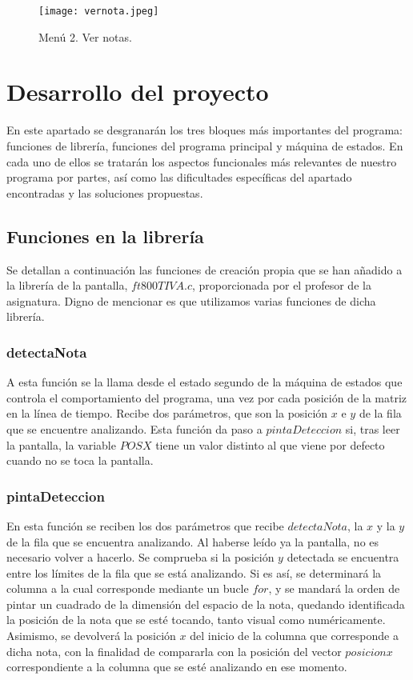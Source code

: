 \documentclass[12pt,a4paper]{article}
\begin{document}
\begin{figure}[h!]
\centering
  \texttt{[image: vernota.jpeg]}
  \caption{Menú 2. Ver notas.}
  \label{fig:img1}
\end{figure}

\section{Desarrollo del proyecto}
En este apartado se desgranarán los tres bloques más importantes del programa: funciones de librería, funciones del programa principal y máquina de estados. En cada uno de ellos se tratarán los aspectos funcionales más relevantes de nuestro programa por partes, así como las dificultades específicas del apartado encontradas y las soluciones propuestas.

\subsection{Funciones en la librería}
Se detallan a continuación las funciones de creación propia que se han añadido a la librería de la pantalla, $ft800TIVA.c$, proporcionada por el profesor de la asignatura. Digno de mencionar es que utilizamos varias funciones de dicha librería.

\subsubsection{detectaNota}
A esta función se la llama desde el estado segundo de la máquina de estados que controla el comportamiento del programa, una vez por cada posición de la matriz en la línea de tiempo. Recibe dos parámetros, que son la posición $x$ e $y$ de la fila que se encuentre analizando.
Esta función da paso a $pintaDeteccion$ si, tras leer la pantalla, la variable $POSX$ tiene un valor distinto al que viene por defecto cuando no se toca la pantalla.

\subsubsection{pintaDeteccion}
En esta función se reciben los dos parámetros que recibe $detectaNota$, la $x$ y la $y$ de la fila que se encuentra analizando. Al haberse leído ya la pantalla, no es necesario volver a hacerlo. 
Se comprueba si la posición $y$ detectada se encuentra entre los límites de la fila que se está analizando. Si es así, se determinará la columna a la cual corresponde mediante un bucle $for$, y se mandará la orden de pintar un cuadrado de la dimensión del espacio de la nota, quedando identificada la posición de la nota que se esté tocando, tanto visual como numéricamente. Asimismo, se devolverá la posición $x$ del inicio de la columna que corresponde a dicha nota, con la finalidad de compararla con la posición del vector $posicionx$ correspondiente a la columna que se esté analizando en ese momento.
\end{document}
